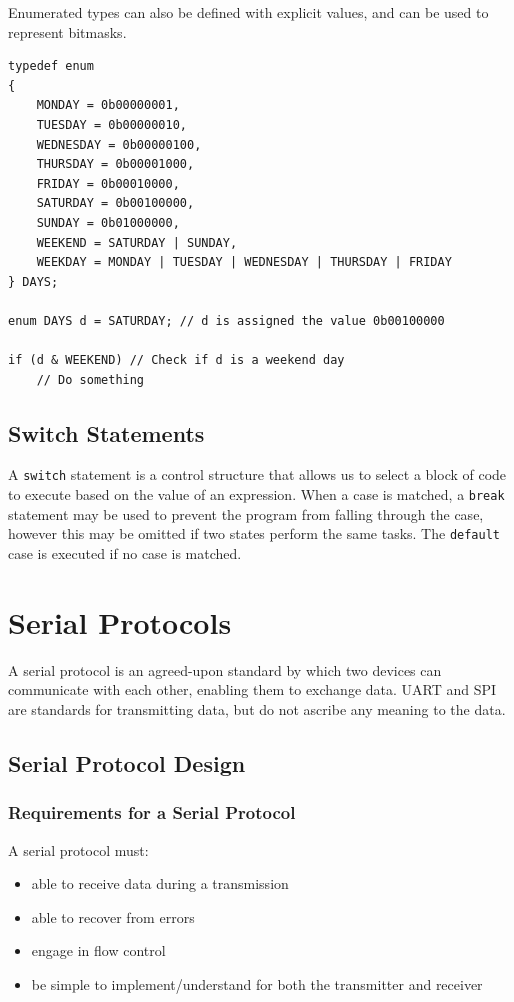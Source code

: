 \documentclass{report}
\begin{document}
Enumerated types can also be defined with explicit values, and can be used to represent bitmasks.
\begin{verbatim}
typedef enum
{
    MONDAY = 0b00000001,
    TUESDAY = 0b00000010,
    WEDNESDAY = 0b00000100,
    THURSDAY = 0b00001000,
    FRIDAY = 0b00010000,
    SATURDAY = 0b00100000,
    SUNDAY = 0b01000000,
    WEEKEND = SATURDAY | SUNDAY,
    WEEKDAY = MONDAY | TUESDAY | WEDNESDAY | THURSDAY | FRIDAY
} DAYS;

enum DAYS d = SATURDAY; // d is assigned the value 0b00100000

if (d & WEEKEND) // Check if d is a weekend day
    // Do something
\end{verbatim}
\section{Switch Statements}
A \texttt{switch} statement is a control structure that allows us to select a block of code to execute based on the value of an expression.
When a case is matched, a \texttt{break} statement may be used to prevent the program from falling
through the case, however this may be omitted if two states perform the same tasks. The \texttt{default} case is executed if no case is matched.
\chapter{Serial Protocols}
A serial protocol is an agreed-upon standard by which two devices can communicate with each other, enabling
them to exchange data. UART and SPI are standards for transmitting data, but do not ascribe any meaning to the data.
\section{Serial Protocol Design}
\subsection{Requirements for a Serial Protocol}
A serial protocol must:
\begin{itemize}
    \item able to receive data during a transmission
    \item able to recover from errors
    \item engage in flow control
    \item be simple to implement/understand for both the transmitter and receiver
\end{itemize}
\end{document}

